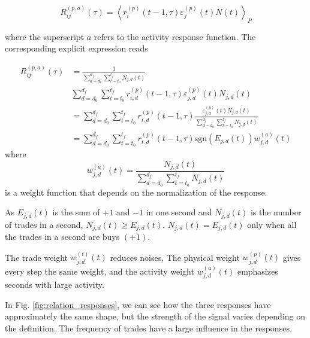 \begin{equation}\label{eq:activity_response_functions_general}
    R^{\left(p, a\right)}_{ij}\left(\tau\right)=\left\langle r^{\left(p\right)}
    _{i}\left(t-1, \tau\right) \varepsilon_{j}^{\left(p\right)} \left(t\right)
    N \left(t \right) \right\rangle _{P}
\end{equation}

where the superscript $a$ refers to the activity response function. The
corresponding explicit expression reads

\begin{align}
    R_{ij}^{\left(p, a\right)}\left(\tau\right)&=\frac{1}{\sum_{d=d_{0}}
    ^{d_{f}} \sum_{t=t_{0}}^{t_{f}}N_{j,d} \left(t\right)} \nonumber \\
    &\sum_{d=d_{0}}^{d_{f}}\sum_{t=t_{0}}^{t_{f}}r^{\left(p\right)}_{i,d}
    \left(t-1,\tau\right) \varepsilon_{j,d}^{\left(p\right)}\left(t\right)
    N_{j,d} \left(t\right)\\
    &=\sum_{d=d_{0}}^{d_{f}} \sum_{t=t_{0}}^{t_{f}}r^{\left(p\right)}_{i,d}
    \left(t-1,\tau\right) \frac{\varepsilon_{j,d}^{\left(p\right)}\left(t \right)
    N_{j,d}\left(t\right)} {\sum_{d=d_{0}}^{d_{f}}\sum_{t=t_{0}}^{t_{f}}
    N_{j,d}\left(t \right)} \nonumber \\
    &=\sum_{d=d_{0}}^{d_{f}} \sum_{t=t_{0}}^{t_{f}}r^{\left(p\right)}_{i,d}
    \left(t-1,\tau\right) \text{sgn}\left(E_{j,d}\left(t\right)\right)
    w_{j,d}^{\left(a\right)}\left(t\right)
\end{align}
where
\begin{equation}
    w_{j,d}^{\left(a\right)}\left(t\right) = \frac{N_{j,d}\left(t \right)}
    {\sum_{d=d_{0}}^{d_{f}}\sum_{t=t_{0}}^{t_{f}}N_{j,d}\left(t\right)}
\end{equation}
is a weight function that depends on the normalization of the response.

As $E_{j,d}\left(t\right)$ is the sum of $+1$ and $-1$ in one second and
$N_{j,d}\left(t\right)$ is the number of trades in a second,
$N_{j,d}\left(t\right) \ge E_{j,d}\left(t\right)$.
$N_{j,d}\left(t\right) = E_{j,d}\left(t\right)$ only when all the trades in a
second are buys $(+1)$.

The trade weight $w_{j,d}^{\left(t\right)}\left(t\right)$ reduces noises, The
physical weight $w_{j,d}^{\left(p\right)}\left(t\right)$ gives every step the
same weight, and the activity weight $w_{j,d}^{\left(a\right)}\left(t\right)$
emphasizes seconds with large activity.

In Fig. \ref{fig:relation_responses}, we can see how the three
responses have approximately the same shape, but the strength of the signal
varies depending on the definition. The frequency of trades have a large
influence in the responses.

